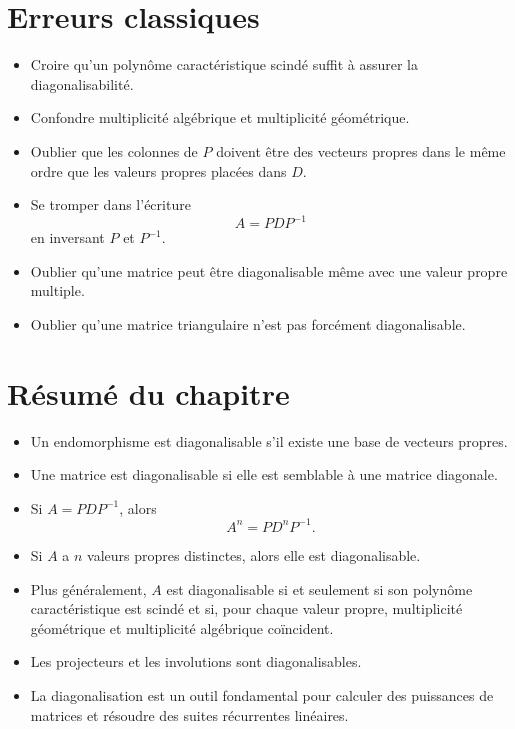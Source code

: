 \documentclass[11pt,a4paper]{article}
\theoremstyle{remark}
\begin{document}
\section{Erreurs classiques}

\begin{itemize}
    \item Croire qu’un polynôme caractéristique scindé suffit à assurer la diagonalisabilité.
    \item Confondre multiplicité algébrique et multiplicité géométrique.
    \item Oublier que les colonnes de \(P\) doivent être des vecteurs propres dans le même ordre que les valeurs propres placées dans \(D\).
    \item Se tromper dans l’écriture
    \[
    A=PDP^{-1}
    \]
    en inversant \(P\) et \(P^{-1}\).
    \item Oublier qu’une matrice peut être diagonalisable même avec une valeur propre multiple.
    \item Oublier qu’une matrice triangulaire n’est pas forcément diagonalisable.
\end{itemize}

\section{Résumé du chapitre}

\begin{itemize}
    \item Un endomorphisme est diagonalisable s’il existe une base de vecteurs propres.
    \item Une matrice est diagonalisable si elle est semblable à une matrice diagonale.
    \item Si \(A=PDP^{-1}\), alors
    \[
    A^n=PD^nP^{-1}.
    \]
    \item Si \(A\) a \(n\) valeurs propres distinctes, alors elle est diagonalisable.
    \item Plus généralement, \(A\) est diagonalisable si et seulement si son polynôme caractéristique est scindé et si, pour chaque valeur propre, multiplicité géométrique et multiplicité algébrique coïncident.
    \item Les projecteurs et les involutions sont diagonalisables.
    \item La diagonalisation est un outil fondamental pour calculer des puissances de matrices et résoudre des suites récurrentes linéaires.
\end{itemize}
\end{document}
